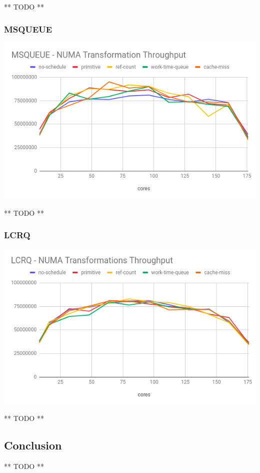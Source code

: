 \documentclass{article}
\begin{document}
 ** TODO **

 \subsubsection{MSQUEUE}

 \includegraphics[width=\textwidth]{graph-msqueue.png}

 ** TODO **

 \subsubsection{LCRQ}

 \includegraphics[width=\textwidth]{graph-lcrq.png}

 ** TODO **

 \subsection{Conclusion}

 ** TODO **
\end{document}

